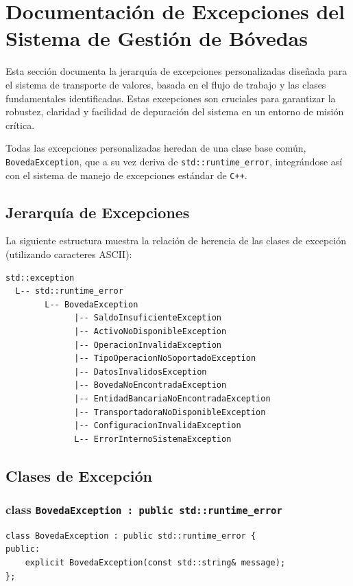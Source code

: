 \documentclass{article}
\newcommand{\inlinecode}[1]{\texttt{#1}}
\begin{document}
\section*{Documentación de Excepciones del Sistema de Gestión de Bóvedas}

Esta sección documenta la jerarquía de excepciones personalizadas diseñada para el sistema de transporte de valores, basada en el flujo de trabajo y las clases fundamentales identificadas. Estas excepciones son cruciales para garantizar la robustez, claridad y facilidad de depuración del sistema en un entorno de misión crítica.

Todas las excepciones personalizadas heredan de una clase base común, \inlinecode{BovedaException}, que a su vez deriva de \inlinecode{std::runtime_error}, integrándose así con el sistema de manejo de excepciones estándar de \inlinecode{C++}.

\subsection*{Jerarquía de Excepciones}

La siguiente estructura muestra la relación de herencia de las clases de excepción (utilizando caracteres ASCII):
\begin{verbatim}
std::exception
  L-- std::runtime_error
        L-- BovedaException
              |-- SaldoInsuficienteException
              |-- ActivoNoDisponibleException
              |-- OperacionInvalidaException
              |-- TipoOperacionNoSoportadoException
              |-- DatosInvalidosException
              |-- BovedaNoEncontradaException
              |-- EntidadBancariaNoEncontradaException
              |-- TransportadoraNoDisponibleException
              |-- ConfiguracionInvalidaException
              L-- ErrorInternoSistemaException
\end{verbatim}

\subsection*{Clases de Excepción}

\subsubsection*{class \inlinecode{BovedaException : public std::runtime_error}}
\begin{lstlisting}
class BovedaException : public std::runtime_error {
public:
    explicit BovedaException(const std::string& message);
};
\end{lstlisting}
\end{document}
